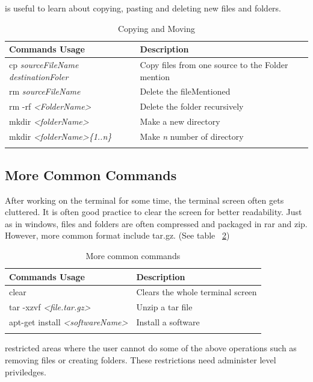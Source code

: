 \documentclass{tufte-book} %
\begin{document}
 is useful to learn about copying, pasting and deleting new files and folders.

\begin{table}
  \begin{tabular}{ll}
    \toprule
    Commands Usage & Description \\
    \midrule
    cp \textit{sourceFileName destinationFoler} & Copy files from one source to the Folder mention \\
    rm \textit{sourceFileName} & Delete the fileMentioned \\
    rm -rf \textit{<FolderName>} & Delete the folder recursively \\
    mkdir \textit{<folderName>} & Make a new directory \\
    mkdir \textit{<folderName>\{1..n\}} & Make \textit{n} number of directory \\
    
    \bottomrule
  \caption{Copying and Moving}
  \end{tabular}
  \label{command1}
\end{table}

\subsection[common commands]{More Common Commands}

\begin{fullwidth}
  After working on the terminal for some time, the terminal screen often gets cluttered. It is often good practice to clear the screen for better readability. Just as in windows, files and folders are often compressed and packaged in rar and zip. However, more common format include tar.gz. (See table ~\ref{command2})
  \end{fullwidth}

\begin{table}
  \begin{tabular}{ll}
    \toprule
    Commands Usage & Description \\
    \midrule
    clear & Clears the whole terminal screen \\
    tar -xzvf\textit{ <file.tar.gz>} & Unzip a tar file \\
    apt-get install \textit{<softwareName>} & Install a software \\
    
    \bottomrule
  \caption{More common commands}
  \end{tabular}
  \label{command2}
\end{table}
 restricted areas where the user cannot do some of the above operations such as removing files or creating folders. These restrictions need administer level priviledges.
\end{document}
